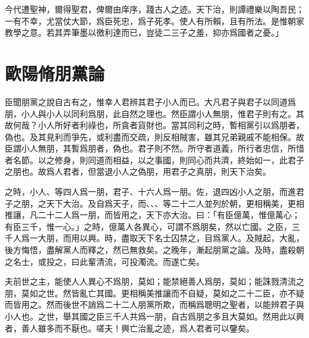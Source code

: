 今代遭聖神，爾得聖君，俾爾由庠序，踐古人之迹。天下治，則譚禮樂以陶吾民；一有不幸，尤當仗大節，爲臣死忠，爲子死孝。使人有所賴，且有所法。是惟朝家教學之意。若其弄筆墨以徼利達而已，豈徒二三子之羞，抑亦爲國者之憂。」


\section[朋黨論\quad{\small 歐陽脩}]{{\normalsize 歐陽脩}\quad 朋黨論}
臣聞朋黨之說自古有之，惟幸人君辨其君子小人而已。大凡君子與君子以同道爲朋，小人與小人以同利爲朋，此自然之理也。然臣謂小人無朋，惟君子則有之。其故何哉？小人所好者利祿也，所貪者貨財也。當其同利之時，暫相黨引以爲朋者，偽也。及其見利而爭先，或利盡而交疏，則反相賊害，雖其兄弟親戚不能相保。故臣謂小人無朋，其暫爲朋者，偽也。君子則不然。所守者道義，所行者忠信，所惜者名節。以之修身，則同道而相益，以之事國，則同心而共濟，終始如一，此君子之朋也。故爲人君者，但當退小人之偽朋，用君子之真朋，則天下治矣。

之時，小人、等四人爲一朋，君子、十六人爲一朋。佐，退四凶小人之朋，而進君子之朋，之天下大治。及自爲天子，而、、、等二十二人並{列}於朝，更相稱美，更相推讓，凡二十二人爲一朋，而皆用之，天下亦大治。曰：「有臣億萬，惟億萬心；有臣三千，惟一心。」之時，億萬人各異心，可謂不爲朋矣，然以亡國。之臣，三千人爲一大朋，而用以興。時，盡取天下名士囚禁之，目爲黨人。及賊起，大亂，後方悔悟，盡解黨人而釋之，然已無救矣。之晚年，漸起朋黨之論。及時，盡殺朝之名士，或投之，曰此輩清流，可投濁流。而遂亡矣。

夫前世之主，能使人人異心不爲朋，莫如；能禁絕善人爲朋，莫如；能誅戮清流之朋，莫如之世。然皆亂亡其國。更相稱美推讓而不自疑，莫如之二十二臣，亦不疑而皆用之。然而後世不誚爲二十二人朋黨所欺，而稱爲聰明之聖者，以能辨君子與小人也。之世，舉其國之臣三千人共爲一朋，自古爲朋之多且大莫如。然用此以興者，善人雖多而不厭也。嗟{夫}！興亡治亂之迹，爲人君者可以鑒矣。

